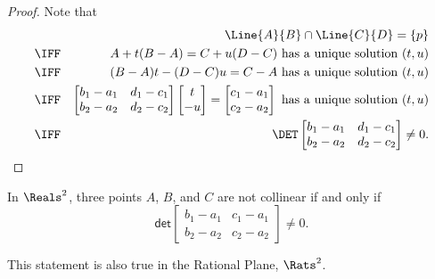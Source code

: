 \documentclass{article}
\begin{document}
\begin{proof}
Note that
\begin{eqnarray*}
 &      & \Line{A}{B} \cap \Line{C}{D} = \{p\} \\
 & \IFF & A + t(B-A) = C + u(D-C)\ \mathrm{has\ a\ unique\ solution}\ (t,u) \\
 & \IFF & (B-A)t - (D-C)u = C-A\ \mathrm{has\ a\ unique\ solution}\ (t,u) \\
 & \IFF & \begin{bmatrix} b_1 - a_1 & d_1 - c_1 \\ b_2 - a_2 & d_2 - c_2 \end{bmatrix} \begin{bmatrix} t \\ -u \end{bmatrix} = \begin{bmatrix} c_1 - a_1 \\ c_2 - a_2 \end{bmatrix}\ \mathrm{has\ a\ unique\ solution}\ (t,u) \\
 & \IFF & \DET \begin{bmatrix} b_1 - a_1 & d_1 - c_1 \\ b_2 - a_2 & d_2 - c_2 \end{bmatrix} \neq 0.
\end{eqnarray*}
\end{proof}

\begin{cor}
In $\Reals^2$, three points $A$, $B$, and $C$ are not collinear if and only if \[ \mathsf{det} \begin{bmatrix} b_1 - a_1 & c_1 - a_1 \\ b_2 - a_2 & c_2 - a_2 \end{bmatrix} \neq 0. \]
\end{cor}

\begin{cor}
This statement is also true in the Rational Plane, $\Rats^2$.
\end{cor}
\end{document}
